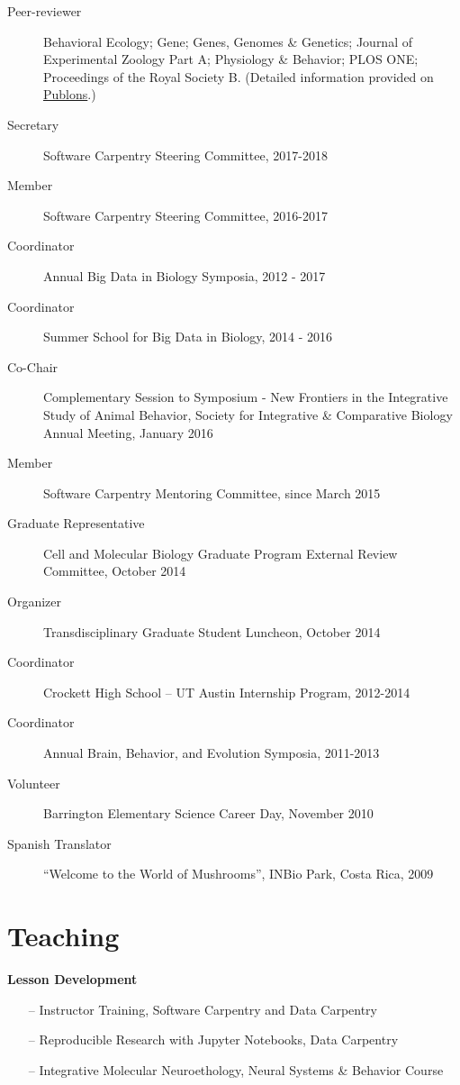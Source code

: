 \documentclass[margin,line]{resume}
\begin{document}
\begin{resume}
\begin{description}
\item[Peer-reviewer] Behavioral Ecology; Gene; Genes, Genomes \& Genetics; Journal of Experimental Zoology Part A; Physiology \& Behavior; PLOS ONE; Proceedings of the Royal Society B. (Detailed information provided on \href{https://publons.com/author/444397/rayna-harris#profile)}{Publons}.) 
\item[Secretary] Software Carpentry Steering Committee, 2017-2018
\item[Member] Software Carpentry Steering Committee, 2016-2017
\item[Coordinator] Annual Big Data in Biology Symposia, 2012 - 2017 
\item[Coordinator] Summer School for Big Data in Biology, 2014 - 2016
\item[Co-Chair] Complementary Session to Symposium - New Frontiers in the Integrative Study of Animal Behavior, Society for Integrative \& Comparative Biology Annual Meeting, January 2016
\item[Member] Software Carpentry Mentoring Committee, since March 2015
\item[Graduate Representative] Cell and Molecular Biology Graduate Program External Review Committee, October 2014 
\item[Organizer] Transdisciplinary Graduate Student Luncheon, October 2014
\item[Coordinator] Crockett High School – UT Austin Internship Program, 2012-2014
\item[Coordinator] Annual Brain, Behavior, and Evolution Symposia, 2011-2013
\item[Volunteer] Barrington Elementary Science Career Day, November 2010
\item[Spanish Translator] “Welcome to the World of Mushrooms”, INBio Park, Costa Rica, 2009
\end{description}

    
\section{\mysidestyle Teaching}
{\bf Lesson Development}
\begin{itemize}
\raggedright
\item[--] Instructor Training, Software Carpentry and Data Carpentry
\item[--] Reproducible Research with Jupyter Notebooks, Data Carpentry
\item[--] Integrative Molecular Neuroethology, Neural Systems \& Behavior Course 


\end{itemize}
\end{resume}
\end{document}
